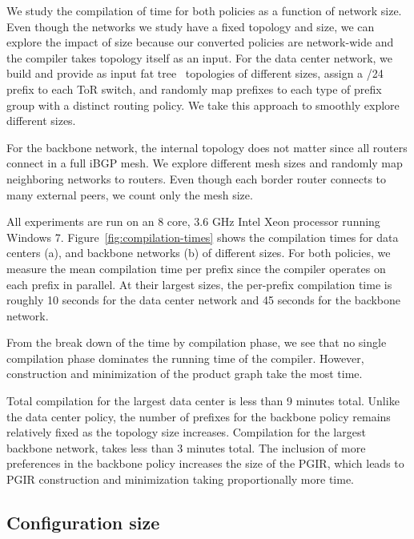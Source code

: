 We study the compilation of time for both policies as a function of network size. Even though the networks we study have a fixed topology and size, we can explore the impact of size because our converted policies are network-wide and the compiler takes topology itself as an input. For the data center network, we build and provide as input fat tree~\cite{fattree} topologies of different sizes, assign a /24 prefix to each ToR switch, and randomly map prefixes to each type of prefix group with a distinct routing policy. We take this approach to smoothly explore different sizes. 

For the backbone network, the internal topology does not matter since all routers connect in a full iBGP mesh. We explore different mesh sizes and randomly map neighboring networks to routers. Even though each border router connects to many external peers, we count only the mesh size.

All experiments are run on an 8 core, 3.6 GHz Intel Xeon processor running Windows 7.
%
Figure~\ref{fig:compilation-times} shows the compilation times for data centers (a), and backbone networks (b) of different sizes. For both policies, we measure the mean compilation time per prefix since the compiler operates on each prefix in parallel. At their largest sizes, the per-prefix compilation time is roughly 10 seconds for the data center network and 45 seconds for the backbone network.

From the break down of the time by compilation phase, we see that no single compilation phase dominates the running time of the compiler. However, construction and minimization of the product graph take the most time.

Total compilation for the largest data center is less than 9 minutes total. Unlike the data center policy, the number of prefixes for the backbone policy remains relatively fixed as the topology size increases. Compilation for the largest backbone network, takes less than 3 minutes total. The inclusion of more preferences in the backbone policy increases the size of the PGIR, which leads to PGIR construction and minimization taking proportionally more time.

%


\subsection{Configuration size}

